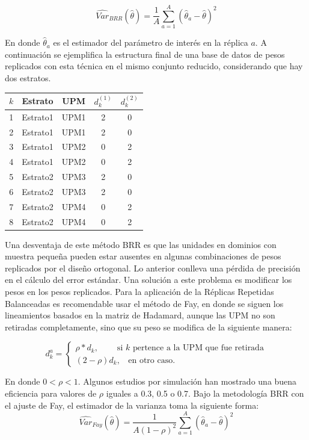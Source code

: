 \documentclass[
  12pt,
]{book}
\begin{document}
\[
\widehat{Var}_{BRR}(\hat{\theta}) = \frac{1}{A}\sum_{a=1}^A(\hat{\theta}_a - \hat\theta )^2
\]

En donde \(\hat{\theta}_a\) es el estimador del parámetro de interés en la réplica \(a\). A continuación se ejemplifica la estructura final de una base de datos de pesos replicados con esta técnica en el mismo conjunto reducido, considerando que hay dos estratos.

\begin{longtable}[]{@{}ccccc@{}}
\toprule()
\(k\) & Estrato & UPM & \(d_k^{(1)}\) & \(d_k^{(2)}\) \\
\midrule()
\endhead
1 & Estrato1 & UPM1 & 2 & 0 \\
2 & Estrato1 & UPM1 & 2 & 0 \\
3 & Estrato1 & UPM2 & 0 & 2 \\
4 & Estrato1 & UPM2 & 0 & 2 \\
5 & Estrato2 & UPM3 & 2 & 0 \\
6 & Estrato2 & UPM3 & 2 & 0 \\
7 & Estrato2 & UPM4 & 0 & 2 \\
8 & Estrato2 & UPM4 & 0 & 2 \\
\bottomrule()
\end{longtable}

Una desventaja de este método BRR es que las unidades en dominios con muestra pequeña pueden estar ausentes en algunas combinaciones de pesos replicados por el diseño ortogonal. Lo anterior conlleva una pérdida de precisión en el cálculo del error estándar. Una solución a este problema es modificar los pesos en los pesos replicados. Para la aplicación de la Réplicas Repetidas Balanceadas es recomendable usar el método de Fay, en donde se siguen los lineamientos basados en la matriz de Hadamard, aunque las UPM no son retiradas completamente, sino que su peso se modifica de la siguiente manera:

\[
d_k^a=
\begin{cases}
\rho*d_k,\ \ \ \  \ \ \ \ \ \ \text{si $k$ pertence a la UPM que fue retirada} \\
(2-\rho)d_k, \ \ \ \ \text{en otro caso.}
\end{cases}
\]

En donde \(0<\rho<1\). Algunos estudios por simulación han mostrado una buena eficiencia para valores de \(\rho\) iguales a 0.3, 0.5 o 0.7. Bajo la metodología BRR con el ajuste de Fay, el estimador de la varianza toma la siguiente forma:
\[
\widehat{Var}_{Fay}(\hat{\theta}) = \frac{1}{A(1-\rho)^2}\sum_{a=1}^A(\hat{\theta}_a - \hat\theta )^2
\]
\end{document}
